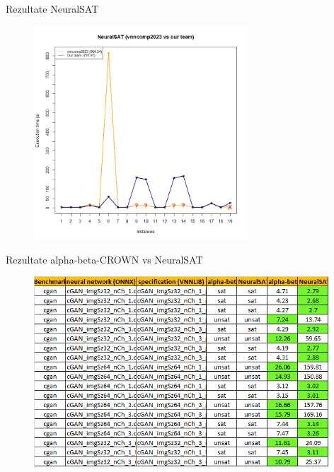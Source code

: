 \begin{frame}{Rezultate NeuralSAT}
    \begin{figure}[ht]
    \centering
    {\includegraphics[width=8cm]{images/interpretare/NeuralSAT_us_vs_vnncomp2023.png}}
    \label{rezultateNeuralSat}
    \end{figure}
\end{frame}

\begin{frame}{Rezultate alpha-beta-CROWN vs NeuralSAT}
    \begin{figure}[ht]
    \centering
    {\includegraphics[width=11cm]{images/interpretare/alpha-beta-CROWN_vs_NeuralSAT.png}}
    \label{rezultateNeuralSat}
    \end{figure}
\end{frame}

